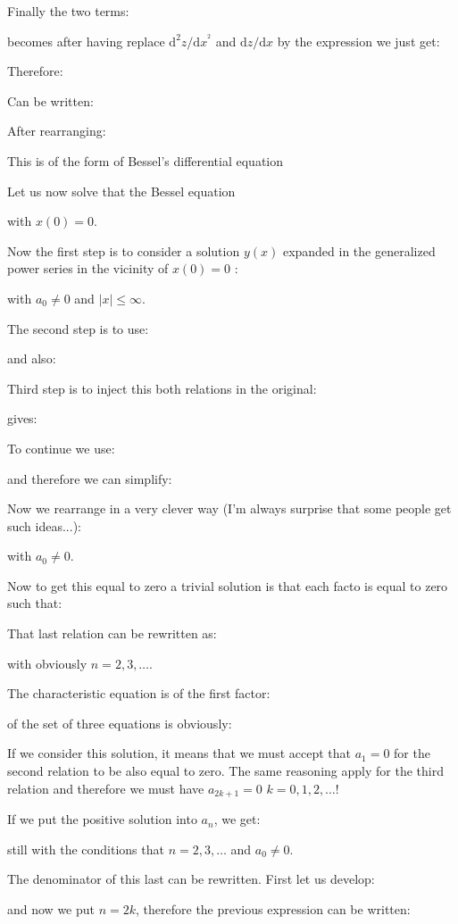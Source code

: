 	Finally the two terms:
	
	becomes after having replace $\mathrm{d}^2z/\mathrm{d}x^^2$ and $\mathrm{d}z/\mathrm{d}x$ by the expression we just get:
	
	Therefore:
	
	Can be written:
	
	After rearranging:
	
	This is of the form of Bessel's differential equation
	
	Let us now solve that the Bessel equation
	
	with $x(0)=0$.
	
	Now the first step is to consider a solution $y(x)$ expanded in the generalized power series in the vicinity of $x(0)=0$ :
	
	with $a_0\neq 0$ and $\left|x\right|\le \infty$.
	
	The second step is to use:
	
	and also:
	
	Third step is to inject this both relations in the original:
	
	gives:
	
	To continue we use:
	
	and therefore we can simplify:
	
	Now we rearrange in a very clever way (I'm always surprise that some people get such ideas...):
	
	with $a_0\neq 0$.
	
	Now to get this equal to zero a trivial solution is that each facto is equal to zero such that:	
	
	That last relation can be rewritten as:
	
	with obviously $n=2,3,\ldots$.
	
	The characteristic equation is of the first factor:
	
	of the set of three equations is obviously:
	
	If we consider this solution, it means that we must accept that $a_1=0$ for the second relation to be also equal to zero. The same reasoning apply for the third relation and therefore we must have $a_{2k+1}=0$  $k = 0,1,2,\ldots$!
	
	If we put the positive solution into $a_n$, we get:
	
	still with the conditions that $n=2,3,\ldots$ and $a_0\neq 0$.
	
	The denominator of this last can be rewritten. First let us develop:
	
	and now we put $n=2k$, therefore the previous expression can be written:
	
